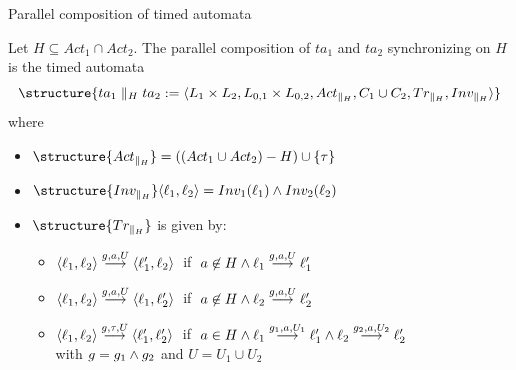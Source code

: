\documentclass[aspectratio=169]{beamer}
\begin{document}
\begin{slide}{Parallel composition of timed automata}
\small

Let $H \subseteq Act_1 \cap Act_2$. The parallel composition of $ta_1$ and  $ta_2$ synchronizing on $H$
is the timed automata
\begin{equation*}
\structure{ta_1 \parallel_H ta_2 := \pair{L_1 \times L_2, L_{0,1} \times L_{0,2}, Act_{\parallel_H}, C_1 \cup C_2, Tr_{\parallel_H}, Inv_{\parallel_H}}}
\end{equation*}
where
\begin{itemize}
\item $\structure{Act_{\parallel_H}} = ((Act_1 \cup Act_2) - H) \cup \enset{\tau}$
\item $\structure{Inv_{\parallel_H}} \pair{\ell_1,\ell_2} = Inv_1(\ell_1) \e  Inv_2(\ell_2)$
\item $\structure{Tr_{\parallel_H}}$ is given by:
\begin{itemize}
\item $\mathopen{\langle}\ell_1,\ell_2\mathclose{\rangle} \stackrel{g,a,U}{\longrightarrow} \mathopen{\langle}\ell'_1,\ell_2\mathclose{\rangle}\; $ if $\; a \not \in H \mathbin{\wedge}  \ell_1 \stackrel{g,a,U}{\longrightarrow} \ell'_1 $
\item $\mathopen{\langle}\ell_1,\ell_2\mathclose{\rangle} \stackrel{g,a,U}{\longrightarrow} \mathopen{\langle}\ell_1,\ell'_2\mathclose{\rangle}\; $ if $\; a \not \in H \mathbin{\wedge}   \ell_2 \stackrel{g,a,U}{\longrightarrow} \ell'_2$
\item $\mathopen{\langle}\ell_1,\ell_2\mathclose{\rangle} \stackrel{g,\tau,U}{\longrightarrow} \mathopen{\langle}\ell'_1,\ell'_2\mathclose{\rangle}\; $ if $\; a \in H \mathbin{\wedge}  \ell_1 \stackrel{g_1,a,U_1}{\longrightarrow} \ell'_1 \mathbin{\wedge} \ell_2 \stackrel{g_2,a,U_2}{\longrightarrow} \ell'_2$\\
with $g = g_1 \mathbin{\wedge} g_2$ and $U = U_1 \cup U_2$
\end{itemize}
\end{itemize}
\end{slide}
\end{document}
